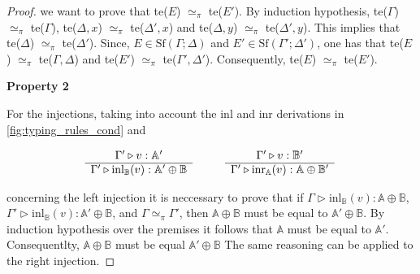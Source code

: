 \documentclass[10pt,a4paper]{amsart}
\theoremstyle{definition}
\theoremstyle{definition}
\theoremstyle{definition}
\theoremstyle{definition}
\theoremstyle{definition}
\theoremstyle{definition}
\begin{document}
\begin{proof}
we want to prove that te($E$) $\simeq_{\pi}$  te($E'$). By induction hypothesis, te($\Gamma$) $\simeq_{\pi}$  te($\Gamma$), te($\Delta,x$) $\simeq_{\pi}$  te($\Delta',x$) and te($\Delta,y$) $\simeq_{\pi}$  te($\Delta',y$). This implies that  te($\Delta$) $\simeq_{\pi}$ te($\Delta'$). Since, $E \in \text{Sf}(\Gamma;\Delta)$ and  $E' \in \text{Sf}(\Gamma';\Delta')$, one has that te($E$) $\simeq_{\pi}$  te($\Gamma, \Delta$) and te($E'$) $\simeq_{\pi}$  te($\Gamma', \Delta'$). Consequently, te($E$) $\simeq_{\pi}$  te($E'$).


\vspace{10pt}
\textbf{Property 2}

For the injections, taking into account the inl and inr derivations in \autoref{fig:typing_rules_cond} and

\begin{figure} [H]
  \begin{equation*}
  \begin{split}
  \begin{aligned}
  & \hspace{15pt}
  \begin{minipage}[t]{0.3\textwidth}
  $\begin{array}{c}
     \Gamma' \triangleright v: \mathbb{A'} \\
    \hline
   \Gamma' \triangleright \text{inl}_{\mathbb{B}}(v):  \mathbb{A'} \oplus \mathbb{B}
\end{array}
$
  \end{minipage} 
 \hspace{20pt}
\begin{minipage}[t]{0.3\textwidth}
$\begin{array}{c}
      \Gamma' \triangleright v:  \mathbb{B'} \\
    \hline
   \Gamma' \triangleright \text{inr}_{\mathbb{A}}(v): \mathbb{A} \oplus \mathbb{B'}
\end{array}
$ \end{minipage}
  \end{aligned}
  \end{split}
  \end{equation*}
  \end{figure}

concerning the left injection it is neccessary to prove that if $\Gamma \triangleright \text{inl}_{\mathbb{B}}(v):  \mathbb{A} \oplus \mathbb{B}$, $\Gamma' \triangleright \text{inl}_{\mathbb{B}}(v):  \mathbb{A'} \oplus \mathbb{B}$, and $\Gamma \simeq_{\pi} \Gamma' $, then $\mathbb{A} \oplus \mathbb{B} $ must be equal to $\mathbb{A}'\oplus \mathbb{B}$. By induction hypothesis over the premises it follows that $\mathbb{A} $ must be equal to $\mathbb{A}'$. Consequentlty, $\mathbb{A}\oplus \mathbb{B}$ must be equal $\mathbb{A'}\oplus \mathbb{B}$  The same reasoning can be applied to the right injection.


\end{proof}
\end{document}
